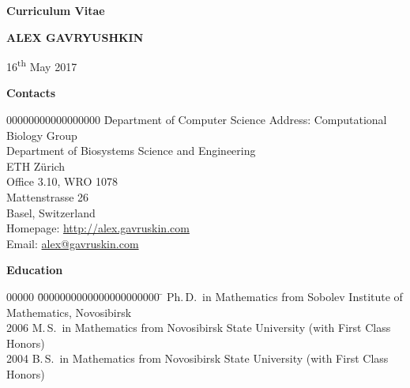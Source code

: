 \documentclass[12pt]{article}
\begin{document}
\centerline{\large \bf Curriculum Vitae}
\vskip5mm
\centerline{\Large \bfseries A\normalsize LEX \Large G\normalsize AVRYUSHKIN}
\vskip5mm
\centerline{16\textsuperscript{th} May 2017}
\vskip5mm

\centerline{\bf Contacts}
\begin{tabbing}
00000000000000000	\= Department of Computer Science	\kill
Address:		\> Computational Biology Group\\
			\> Department of Biosystems Science and Engineering\\
			\> ETH Z\"urich\\
			\> Office 3.10, WRO 1078\\
			\> Mattenstrasse 26\\
			 Basel, Switzerland\\
Homepage:		\> \href{http://alex.gavruskin.com}{http://alex.gavruskin.com}\\
Email:			\> \href{mailto:alex@gavruskin.com}{alex@gavruskin.com}
\end{tabbing}

\centerline{\bf Education}
\begin{tabbing}
00000	\= 0000000000000000000000	\=		\> Ph.\,D.\ in Mathematics	\> from Sobolev Institute of Mathematics, Novosibirsk\\
2006	\> M.\,S.\ in Mathematics	\> from Novosibirsk State University (with First Class Honors)\\
2004	\> B.\,S.\ in Mathematics	\> from Novosibirsk State University (with First Class Honors)
\end{tabbing}
\end{document}

